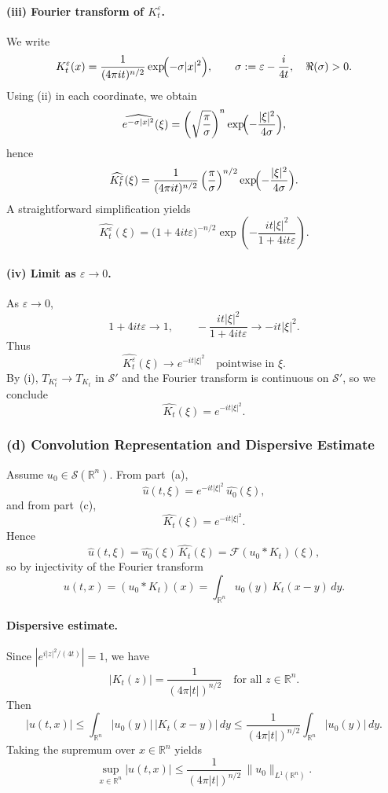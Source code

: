 \documentclass[12pt,a4paper]{article}
\theoremstyle{plain}
\theoremstyle{definition}
\theoremstyle{remark}
\theoremstyle{remark}
\begin{document}
\paragraph{\textbf{(iii) Fourier transform of $K_t^\varepsilon$.}}
We write
\[
K_t^\varepsilon(x)
= \frac{1}{(4\pi i t)^{n/2}}\exp\!\Bigl(-\sigma |x|^2\Bigr),
\qquad
\sigma := \varepsilon - \frac{i}{4t},\quad \Re(\sigma)>0.
\]
Using (ii) in each coordinate, we obtain
\[
\widehat{e^{-\sigma |x|^2}}(\xi)
= \left(\sqrt{\frac{\pi}{\sigma}}\right)^n
\exp\!\Bigl(-\frac{|\xi|^2}{4\sigma}\Bigr),
\]
hence
\[
\widehat{K_t^\varepsilon}(\xi)
= \frac{1}{(4\pi i t)^{n/2}}
\left(\frac{\pi}{\sigma}\right)^{n/2}
\exp\!\Bigl(-\frac{|\xi|^2}{4\sigma}\Bigr).
\]
A straightforward simplification yields
\[
\widehat{K_t^\varepsilon}(\xi)
= \bigl(1+4it\varepsilon\bigr)^{-n/2}
\exp\!\left(-\frac{it|\xi|^2}{1+4it\varepsilon}\right).
\]

\paragraph{\textbf{(iv) Limit as $\varepsilon\to0$.}}
As $\varepsilon\to0$,
\[
1+4it\varepsilon \to 1,
\qquad
-\frac{it|\xi|^2}{1+4it\varepsilon} \to -it|\xi|^2.
\]
Thus
\[
\widehat{K_t^\varepsilon}(\xi) \longrightarrow e^{-it|\xi|^2}
\quad\text{pointwise in }\xi.
\]
By (i), $T_{K_t^\varepsilon}\to T_{K_t}$ in $\mathscr{S}'$ and the
Fourier transform is continuous on $\mathscr{S}'$, so we conclude
\[
\widehat{K_t}(\xi) = e^{-it|\xi|^2}.
\]

\subsubsection*{(d) \; Convolution Representation and Dispersive Estimate}

Assume $u_0\in\mathscr{S}(\mathbb{R}^n)$. From part~(a),
\[
\widehat{u}(t,\xi) = e^{-it|\xi|^2}\,\widehat{u_0}(\xi),
\]
and from part~(c),
\[
\widehat{K_t}(\xi) = e^{-it|\xi|^2}.
\]
Hence
\[
\widehat{u}(t,\xi)
= \widehat{u_0}(\xi)\,\widehat{K_t}(\xi)
= \mathcal{F}(u_0 * K_t)(\xi),
\]
so by injectivity of the Fourier transform
\[
u(t,x) = (u_0 * K_t)(x)
= \int_{\mathbb{R}^n} u_0(y)\,K_t(x-y)\,dy.
\]

\paragraph{\textbf{Dispersive estimate.}}
Since $|e^{i|z|^2/(4t)}| = 1$, we have
\[
|K_t(z)| = \frac{1}{(4\pi |t|)^{n/2}}
\quad\text{for all } z\in\mathbb{R}^n.
\]
Then
\[
|u(t,x)|
\le \int_{\mathbb{R}^n} |u_0(y)|\,|K_t(x-y)|\,dy
\le \frac{1}{(4\pi|t|)^{n/2}} \int_{\mathbb{R}^n} |u_0(y)|\,dy.
\]
Taking the supremum over $x\in\mathbb{R}^n$ yields
\[
\sup_{x\in\mathbb{R}^n} |u(t,x)|
\le \frac{1}{(4\pi|t|)^{n/2}}\,\|u_0\|_{L^1(\mathbb{R}^n)}.
\]
\end{document}
